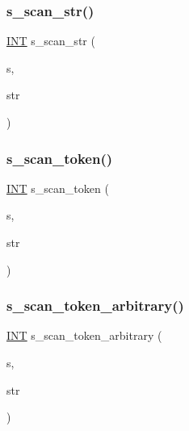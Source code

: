 \mbox{\label{util_8_c_aa5a6bfecf494238e86fe3ec539fd0682}} 
\subsubsection{\texorpdfstring{s\+\_\+scan\+\_\+str()}{s\_scan\_str()}}
{\footnotesize\ttfamily \mbox{\hyperlink{galois_8h_a09fddde158a3a20bd2dcadb609de11dc}{I\+NT}} s\+\_\+scan\+\_\+str (\begin{DoxyParamCaption}\item[{\mbox{\hyperlink{galois_8h_ab6cc7b4aeb6ea31aba2b3fbfc83ff5e6}{B\+Y\+TE}} $\ast$$\ast$}]{s,  }\item[{\mbox{\hyperlink{galois_8h_ab6cc7b4aeb6ea31aba2b3fbfc83ff5e6}{B\+Y\+TE}} $\ast$}]{str }\end{DoxyParamCaption})}

\mbox{\label{util_8_c_a8d1a4ad92d09138f7a1a7e389469ed45}} 
\subsubsection{\texorpdfstring{s\+\_\+scan\+\_\+token()}{s\_scan\_token()}}
{\footnotesize\ttfamily \mbox{\hyperlink{galois_8h_a09fddde158a3a20bd2dcadb609de11dc}{I\+NT}} s\+\_\+scan\+\_\+token (\begin{DoxyParamCaption}\item[{\mbox{\hyperlink{galois_8h_ab6cc7b4aeb6ea31aba2b3fbfc83ff5e6}{B\+Y\+TE}} $\ast$$\ast$}]{s,  }\item[{\mbox{\hyperlink{galois_8h_ab6cc7b4aeb6ea31aba2b3fbfc83ff5e6}{B\+Y\+TE}} $\ast$}]{str }\end{DoxyParamCaption})}

\mbox{\label{util_8_c_aa2a992efd4d871acb1d802a4e5001d8d}} 
\subsubsection{\texorpdfstring{s\+\_\+scan\+\_\+token\+\_\+arbitrary()}{s\_scan\_token\_arbitrary()}}
{\footnotesize\ttfamily \mbox{\hyperlink{galois_8h_a09fddde158a3a20bd2dcadb609de11dc}{I\+NT}} s\+\_\+scan\+\_\+token\+\_\+arbitrary (\begin{DoxyParamCaption}\item[{\mbox{\hyperlink{galois_8h_ab6cc7b4aeb6ea31aba2b3fbfc83ff5e6}{B\+Y\+TE}} $\ast$$\ast$}]{s,  }\item[{\mbox{\hyperlink{galois_8h_ab6cc7b4aeb6ea31aba2b3fbfc83ff5e6}{B\+Y\+TE}} $\ast$}]{str }\end{DoxyParamCaption})}

